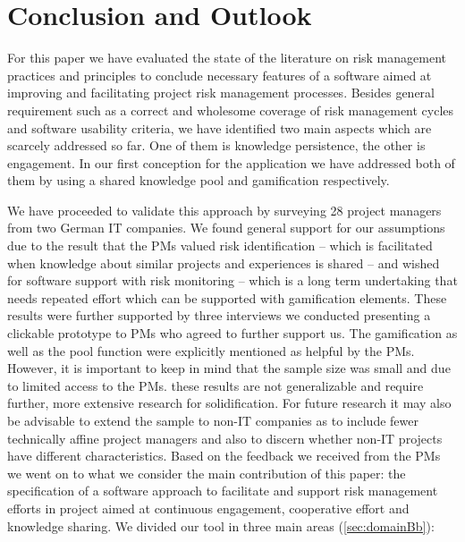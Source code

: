 \chapter{Conclusion and Outlook}
\label{ch:conclusionoutlookB}

For this paper we have evaluated the state of the literature on risk management practices and principles to conclude necessary features of a software aimed at improving and facilitating project risk management processes. Besides general requirement such as a correct and wholesome coverage of risk management cycles and software usability criteria, we have identified two main aspects which are scarcely addressed so far. One of them is knowledge persistence, the other is engagement. In our first conception for the application we have addressed both of them by using a shared knowledge pool and gamification respectively.

We have proceeded to validate this approach by surveying 28 project managers from two German IT companies. We found general support for our assumptions due to the result that the PMs valued risk identification – which is facilitated when knowledge about similar projects and experiences is shared – and wished for software support with risk monitoring – which is a long term undertaking that needs repeated effort which can be supported with gamification elements. These results were further supported by three interviews we conducted presenting a clickable prototype to PMs who agreed to further support us. The gamification as well as the pool function were explicitly mentioned as helpful by the PMs. However, it is important to keep in mind that the sample size was small and due to limited access to the PMs. these results are not generalizable and require further, more extensive research for solidification. For future research it may also be advisable to extend the sample to non-IT companies as to include fewer technically affine project managers and also to discern whether non-IT projects have different characteristics.
Based on the feedback we received from the PMs we went on to what we consider the main contribution of this paper: the specification of a software approach to facilitate and support risk management efforts in project aimed at continuous engagement, cooperative effort and knowledge sharing. We divided our tool in three main areas (\ref{sec:domainBb}): 


